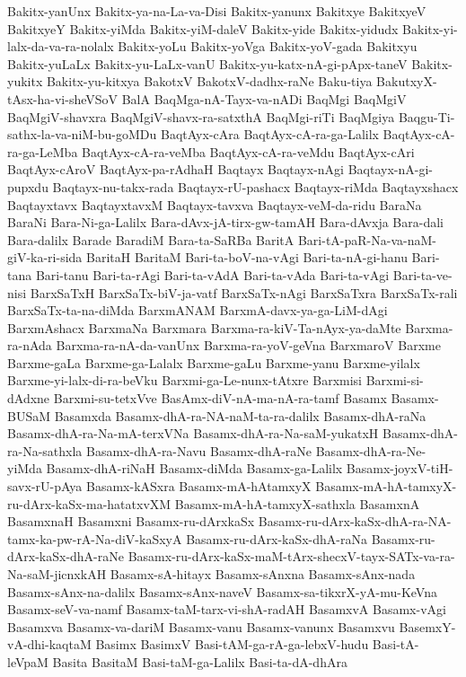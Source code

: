 {Bakitx-yanUnx
Bakitx-ya-na-La-va-Disi
Bakitx-yanunx
Bakitxye
BakitxyeV
BakitxyeY
Bakitx-yiMda
Bakitx-yiM-daleV
Bakitx-yide
Bakitx-yidudx
Bakitx-yi-lalx-da-va-ra-nolalx
Bakitx-yoLu
Bakitx-yoVga
Bakitx-yoV-gada
Bakitxyu
Bakitx-yuLaLx
Bakitx-yu-LaLx-vanU
Bakitx-yu-katx-nA-gi-pApx-taneV
Bakitx-yukitx
Bakitx-yu-kitxya
BakotxV
BakotxV-dadhx-raNe
Baku-tiya
BakutxyX-tAsx-ha-vi-sheVSoV
BalA
BaqMga-nA-Tayx-va-nADi
BaqMgi
BaqMgiV
BaqMgiV-shavxra
BaqMgiV-shavx-ra-satxthA
BaqMgi-riTi
BaqMgiya
Baqgu-Ti-sathx-la-va-niM-bu-goMDu
BaqtAyx-cAra
BaqtAyx-cA-ra-ga-Lalilx
BaqtAyx-cA-ra-ga-LeMba
BaqtAyx-cA-ra-veMba
BaqtAyx-cA-ra-veMdu
BaqtAyx-cAri
BaqtAyx-cAroV
BaqtAyx-pa-rAdhaH
Baqtayx
Baqtayx-nAgi
Baqtayx-nA-gi-pupxdu
Baqtayx-nu-takx-rada
Baqtayx-rU-pashacx
Baqtayx-riMda
Baqtayxshacx
Baqtayxtavx
BaqtayxtavxM
Baqtayx-tavxva
Baqtayx-veM-da-ridu
BaraNa
BaraNi
Bara-Ni-ga-Lalilx
Bara-dAvx-jA-tirx-gw-tamAH
Bara-dAvxja
Bara-dali
Bara-dalilx
Barade
BaradiM
Bara-ta-SaRBa
BaritA
Bari-tA-paR-Na-va-naM-giV-ka-ri-sida
BaritaH
BaritaM
Bari-ta-boV-na-vAgi
Bari-ta-nA-gi-hanu
Bari-tana
Bari-tanu
Bari-ta-rAgi
Bari-ta-vAdA
Bari-ta-vAda
Bari-ta-vAgi
Bari-ta-ve-nisi
BarxSaTxH
BarxSaTx-biV-ja-vatf
BarxSaTx-nAgi
BarxSaTxra
BarxSaTx-rali
BarxSaTx-ta-na-diMda
BarxmANAM
BarxmA-davx-ya-ga-LiM-dAgi
BarxmAshacx
BarxmaNa
Barxmara
Barxma-ra-kiV-Ta-nAyx-ya-daMte
Barxma-ra-nAda
Barxma-ra-nA-da-vanUnx
Barxma-ra-yoV-geVna
BarxmaroV
Barxme
Barxme-gaLa
Barxme-ga-Lalalx
Barxme-gaLu
Barxme-yanu
Barxme-yilalx
Barxme-yi-lalx-di-ra-beVku
Barxmi-ga-Le-nunx-tAtxre
Barxmisi
Barxmi-si-dAdxne
Barxmi-su-tetxVve
BasAmx-diV-nA-ma-nA-ra-tamf
Basamx
Basamx-BUSaM
Basamxda
Basamx-dhA-ra-NA-naM-ta-ra-dalilx
Basamx-dhA-raNa
Basamx-dhA-ra-Na-mA-terxVNa
Basamx-dhA-ra-Na-saM-yukatxH
Basamx-dhA-ra-Na-sathxla
Basamx-dhA-ra-Navu
Basamx-dhA-raNe
Basamx-dhA-ra-Ne-yiMda
Basamx-dhA-riNaH
Basamx-diMda
Basamx-ga-Lalilx
Basamx-joyxV-tiH-savx-rU-pAya
Basamx-kASxra
Basamx-mA-hAtamxyX
Basamx-mA-hA-tamxyX-ru-dArx-kaSx-ma-hatatxvXM
Basamx-mA-hA-tamxyX-sathxla
BasamxnA
BasamxnaH
Basamxni
Basamx-ru-dArxkaSx
Basamx-ru-dArx-kaSx-dhA-ra-NA-tamx-ka-pw-rA-Na-diV-kaSxyA
Basamx-ru-dArx-kaSx-dhA-raNa
Basamx-ru-dArx-kaSx-dhA-raNe
Basamx-ru-dArx-kaSx-maM-tArx-shecxV-tayx-SATx-va-ra-Na-saM-jicnxkAH
Basamx-sA-hitayx
Basamx-sAnxna
Basamx-sAnx-nada
Basamx-sAnx-na-dalilx
Basamx-sAnx-naveV
Basamx-sa-tikxrX-yA-mu-KeVna
Basamx-seV-va-namf
Basamx-taM-tarx-vi-shA-radAH
BasamxvA
Basamx-vAgi
Basamxva
Basamx-va-dariM
Basamx-vanu
Basamx-vanunx
Basamxvu
BasemxY-vA-dhi-kaqtaM
Basimx
BasimxV
Basi-tAM-ga-rA-ga-lebxV-hudu
Basi-tA-leVpaM
Basita
BasitaM
Basi-taM-ga-Lalilx
Basi-ta-dA-dhAra
}
